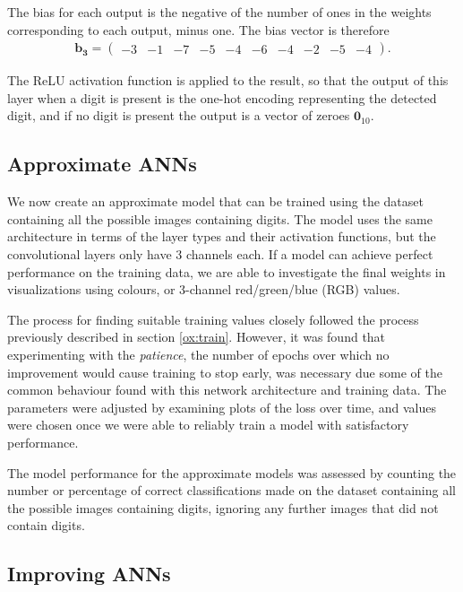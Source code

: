 \documentclass{somasmsc}
\begin{document}
The bias for each output is the negative of the number of ones in the weights corresponding to each output, minus one. The bias vector is therefore
\begin{align*}
    \pmb{b_3} =
    \begin{pmatrix}
        -3 & -1 & -7 & -5 & -4 & -6 & -4 & -2 & -5 & -4
    \end{pmatrix}.
\end{align*}

The ReLU activation function is applied to the result, so that the output of this layer when a digit is present is the one-hot encoding representing the detected digit, and if no digit is present the output is a vector of zeroes $\mathbf{0}_{10}$.

\subsection{Approximate ANNs}

We now create an approximate model that can be trained using the dataset containing all the possible images containing digits. The model uses the same architecture in terms of the layer types and their activation functions, but the convolutional layers only have 3 channels each. If a model can achieve perfect performance on the training data, we are able to investigate the final weights in visualizations using colours, or 3-channel red/green/blue (RGB) values.

The process for finding suitable training values closely followed the process previously described in section \ref{ox:train}. However, it was found that experimenting with the \textit{patience}, the number of epochs over which no improvement would cause training to stop early, was necessary due some of the common behaviour found with this network architecture and training data. The parameters were adjusted by examining plots of the loss over time, and values were chosen once we were able to reliably train a model with satisfactory performance.

The model performance for the approximate models was assessed by counting the number or percentage of correct classifications made on the dataset containing all the possible images containing digits, ignoring any further images that did not contain digits.

\subsection{Improving ANNs}
\end{document}
